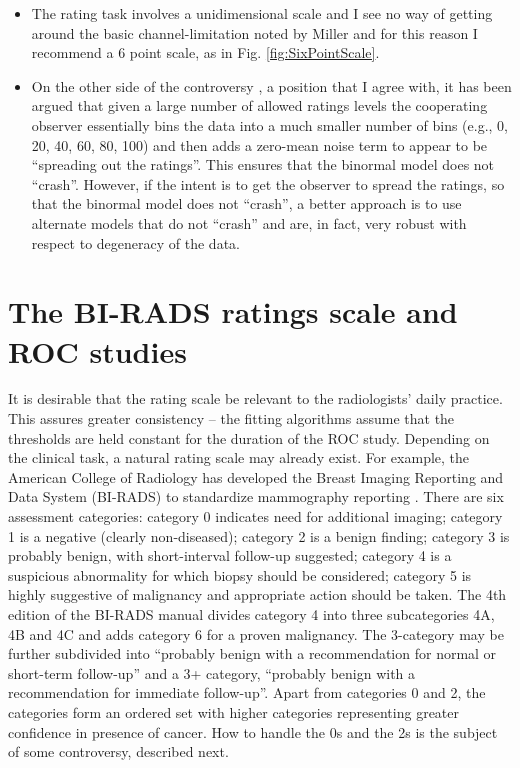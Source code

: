 \documentclass[
]{book}
\begin{document}
\begin{itemize}
\item
  The rating task involves a unidimensional scale and I see no way of getting around the basic channel-limitation noted by Miller and for this reason I recommend a 6 point scale, as in Fig. \ref{fig:SixPointScale}.
\item
  On the other side of the controversy \citep{berbaum2002empirical}, a position that I agree with, it has been argued that given a large number of allowed ratings levels the cooperating observer essentially bins the data into a much smaller number of bins (e.g., 0, 20, 40, 60, 80, 100) and then adds a zero-mean noise term to appear to be ``spreading out the ratings''. This ensures that the binormal model does not ``crash''. However, if the intent is to get the observer to spread the ratings, so that the binormal model does not ``crash'', a better approach is to use alternate models that do not ``crash'' and are, in fact, very robust with respect to degeneracy of the data.
\end{itemize}

\hypertarget{binary-task-birads-rating-scale}{%
\section{The BI-RADS ratings scale and ROC studies}\label{binary-task-birads-rating-scale}}

It is desirable that the rating scale be relevant to the radiologists' daily practice. This assures greater consistency -- the fitting algorithms assume that the thresholds are held constant for the duration of the ROC study. Depending on the clinical task, a natural rating scale may already exist. For example, the American College of Radiology has developed the Breast Imaging Reporting and Data System (BI-RADS) to standardize mammography reporting \citep{liberman2002breast}. There are six assessment categories: category 0 indicates need for additional imaging; category 1 is a negative (clearly non-diseased); category 2 is a benign finding; category 3 is probably benign, with short-interval follow-up suggested; category 4 is a suspicious abnormality for which biopsy should be considered; category 5 is highly suggestive of malignancy and appropriate action should be taken. The 4th edition of the BI-RADS manual divides category 4 into three subcategories 4A, 4B and 4C and adds category 6 for a proven malignancy. The 3-category may be further subdivided into ``probably benign with a recommendation for normal or short-term follow-up'' and a 3+ category, ``probably benign with a recommendation for immediate follow-up''. Apart from categories 0 and 2, the categories form an ordered set with higher categories representing greater confidence in presence of cancer. How to handle the 0s and the 2s is the subject of some controversy, described next.
\end{document}

